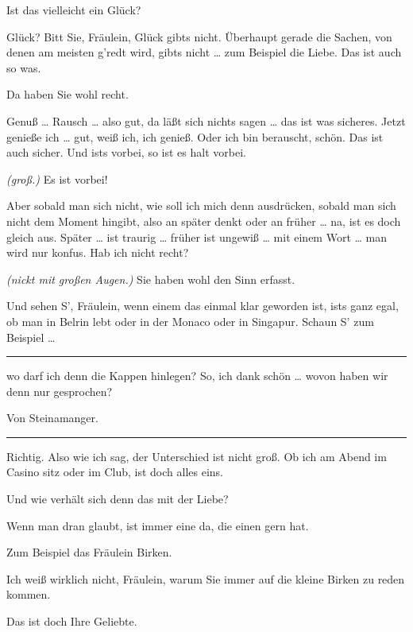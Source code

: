 \documentclass[
	final,
	a4paper,
	ngerman,
	mpinclude = true, %
	twoside = true,
	open = right,
	cleardoublepage = plain,
	DIV = 13,
	BCOR = 1cm,
	titlepage = firstiscover,
	]{scrbook}
\newcommand{\marginnote}[1]{\marginpar{\singlespacing\raggedright\footnotesize#1}}
\newcommand{\direction}[1]{\textit{(#1)}}
\newenvironment{deletion}{%
		\vspace{0.25\baselineskip}
		\hrule
		\vspace{0.25\baselineskip}
		\color{darkgray}
	}{
		\color{black}
		\vspace{0.25\baselineskip}
		\hrule 
		\vspace{0.25\baselineskip}
	}
\newcommand{\thecharacter}[1]{\textup{\textsc{#1}}\xspace}
\newcommand{\theschauspielerin}{\thecharacter{Schauspielerin}}
\newcommand{\thegraf}{\thecharacter{Entrepeneurin}}
\newcommand{\character}[1]{\item[#1:]}
\newcommand{\schauspielerin}{\character{\theschauspielerin}}
\newcommand{\entrepeneurin}{\character{\thegraf}}
\begin{document}
\begin{play}
	\schauspielerin
	Ist das vielleicht ein Glück?

	\entrepeneurin
	Glück? Bitt Sie, Fräulein, Glück gibts nicht. Überhaupt gerade die Sachen, von denen am meisten g'redt wird, gibts nicht \ldots{} zum Beispiel die Liebe. Das ist auch so was.

	\schauspielerin
	Da haben Sie wohl recht.

	\entrepeneurin
	Genuß \ldots{} Rausch \ldots{} also gut, da läßt sich nichts sagen \ldots{} das ist was sicheres. Jetzt genieße ich \ldots{} gut, weiß ich, ich genieß. Oder ich bin berauscht, schön. Das ist auch sicher. Und ists vorbei, so ist es halt vorbei.

	\schauspielerin
	\direction{groß.} Es ist vorbei!

	\entrepeneurin
	Aber sobald man sich nicht, wie soll ich mich denn ausdrücken, sobald man sich nicht dem Moment hingibt, also an später denkt oder an früher \ldots{} na, ist es doch gleich aus. Später \ldots{} ist traurig \ldots{} früher ist ungewiß \ldots{} mit einem Wort \ldots{} man wird nur konfus. Hab ich nicht recht?

	\marginnote{\enquote{Komm, zieh mich aus jetzt!}}
	\schauspielerin
	\direction{nickt mit großen Augen.} Sie haben wohl den Sinn erfasst.

	\entrepeneurin
	Und sehen S', Fräulein, wenn einem das einmal klar geworden ist, ists ganz egal, ob man in Belrin lebt oder in der Monaco oder in Singapur. Schaun S' zum Beispiel \ldots{}
	\begin{deletion}
		wo darf ich denn die Kappen hinlegen? So, ich dank schön \ldots{} wovon haben wir denn nur gesprochen?

	\schauspielerin
	Von Steinamanger.

	\entrepeneurin
	\end{deletion}
	Richtig. Also wie ich sag, der Unterschied ist nicht groß. Ob ich am Abend im Casino sitz oder im Club, ist doch alles eins.

	\schauspielerin
	Und wie verhält sich denn das mit der Liebe?

	\entrepeneurin
	Wenn man dran glaubt, ist immer eine da, die einen gern hat.

	\schauspielerin
	Zum Beispiel das Fräulein Birken.

	\entrepeneurin
	Ich weiß wirklich nicht, Fräulein, warum Sie immer auf die kleine Birken zu reden kommen.

	\schauspielerin
	Das ist doch Ihre Geliebte.


\end{play}
\end{document}
